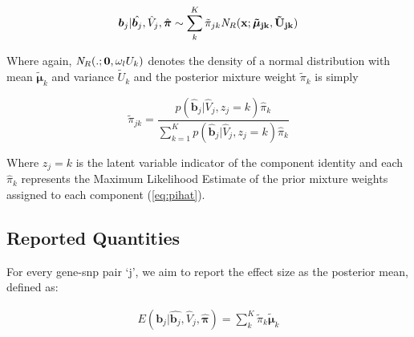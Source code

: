 \begin{enumerate}
\begin{equation}
\begin{aligned}
  \label{eq:mixpost}
\bm{b}_{j} | \hat{\bm{b}_{j}}, \hat{V}_{j}, \hat{\bm{\pi}} 
\sim \sum_{k}^{K}  \tilde \pi_{jk} {\it N}_R (\bf{x};\bm{\tilde{\mu}}_{jk},\tilde{U} _{jk} )%


\end{aligned}
\end{equation}

Where again, ${\it N}_R(.; \bm{0}, \omega_l U_{k})$ denotes the density of a normal distribution with mean $\bm{\tilde{\mu}}_{k}$ and variance $\tilde{U} _{k}$ and the posterior mixture weight $\tilde \pi_{k}$ is simply 



 \begin{equation}
\tilde \pi_{jk} =\frac{ p(\hat{\bm{b}}_{j}| \hat{V}_{j}, z_{j}=k) \hat \pi_{k} } {\sum_{k=1}^{K} p(\hat{\bm{b}}_{j}| \hat{V}_{j}, z_{j}=k) \hat\pi_{k}}
 \label{eqn:postpi}
\end{equation}

Where $z_{j}=k$ is the latent variable indicator of the component identity and each $\hat\pi_{k}$ represents the Maximum Likelihood Estimate of the prior mixture weights assigned to each component (\ref{eq:pihat}).

\subsection{Reported Quantities}

For every gene-snp pair `j', we aim to report the effect size as the posterior mean, defined as:

\begin{equation}
\begin{aligned}
E(\bm{b}_{j} | \hat{\bm{b}_{j}}, \hat{V}_{j}, \hat{\bm{\pi}})
= \sum_{k}^{K}  \tilde \pi_{k} \bm{\tilde{\mu}}_{k} %
\end{aligned}
\label{eq:mixmean}
\end{equation}



\end{enumerate}
